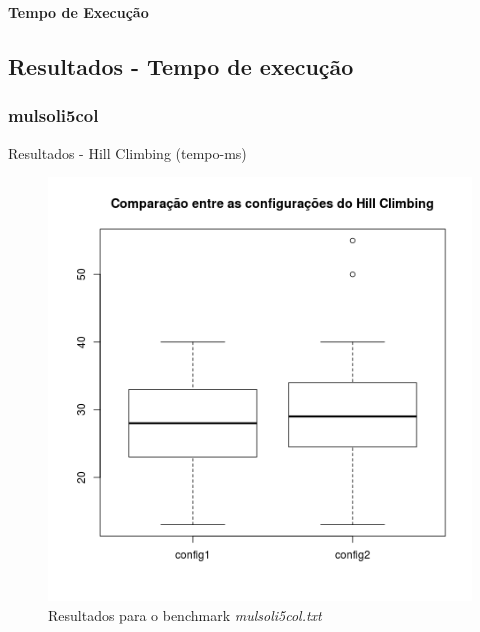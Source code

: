 \documentclass[compress, hide notes]{beamer}
\begin{document}
        
        
	\begin{frame}{}
		\centering
		\Huge \color{blue} \textbf{Tempo de Execução}
	\end{frame}
        
        
        
        \subsection{Resultados - Tempo de execução}
    
    	\subsubsection{mulsoli5col}
		
        \begin{frame}{Resultados - Hill Climbing (tempo-ms)}
        
        	\begin{figure}[H]
			\centering
            \label{fig:tmp-hc-mulsoli5col}
            \includegraphics[width=0.6\linewidth]{img/hill-tmp-mulsoli5col.png}
            \caption[Resultados para o benchmark mulsoli5col.txt]{Resultados para o benchmark \textit{mulsoli5col.txt}}
			\end{figure}

		\end{frame}
        
\end{document}
